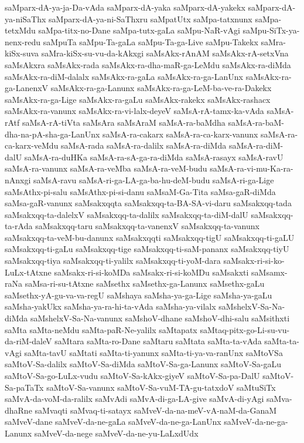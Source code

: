 {saMparx-dA-ya-ja-Da-vAda
saMparx-dA-yaka
saMparx-dA-yakekx
saMparx-dA-ya-niSaThx
saMparx-dA-ya-ni-SaThxru
saMpatUtx
saMpa-tatxnunx
saMpa-tetxMdu
saMpa-titx-no-Dane
saMpa-tutx-gaLa
saMpu-NaR-vAgi
saMpu-SiTx-ya-nenx-redu
saMpuTa
saMpu-Ta-gaLa
saMpu-Ta-ga-Live
saMpu-Takekx
saMra-kiSx-suva
saMra-kiSx-su-vu-da-kAkxgi
saMsAkx-rAnAM
saMsAkx-rA-setxVna
saMsAkxra
saMsAkx-rada
saMsAkx-ra-dha-maR-ga-LeMdu
saMsAkx-ra-diMda
saMsAkx-ra-diM-dalalx
saMsAkx-ra-gaLa
saMsAkx-ra-ga-LanUnx
saMsAkx-ra-ga-LanenxV
saMsAkx-ra-ga-Lanunx
saMsAkx-ra-ga-LeM-ba-ve-ra-Dakekx
saMsAkx-ra-ga-Lige
saMsAkx-ra-gaLu
saMsAkx-rakekx
saMsAkx-rashacx
saMsAkx-ra-vanunx
saMsAkx-ra-vi-lalx-deyeV
saMsA-rA-tamx-ka-vAda
saMsA-rAtf
saMsA-rA-tiVta
saMsAra
saMsAraM
saMsA-ra-baMdha
saMsA-ra-baM-dha-na-pA-sha-ga-LanUnx
saMsA-ra-cakarx
saMsA-ra-ca-karx-vanunx
saMsA-ra-ca-karx-veMdu
saMsA-rada
saMsA-ra-dalilx
saMsA-ra-diMda
saMsA-ra-diM-dalU
saMsA-ra-duHKa
saMsA-ra-sA-ga-ra-diMda
saMsA-rasayx
saMsA-ravU
saMsA-ra-vanunx
saMsA-ra-veMba
saMsA-ra-veM-budu
saMsA-ra-vi-mu-Ka-ra-nAnxgi
saMsA-ravu
saMsA-ri-ga-LA-ga-ba-hu-deM-budu
saMsA-ri-ga-Lige
saMsAthx-pi-salu
saMsAthx-pi-si-danu
saMsaM-Ga-Tita
saMsa-gaR-diMda
saMsa-gaR-vanunx
saMsakxqqta
saMsakxqq-ta-BA-SA-vi-daru
saMsakxqq-tada
saMsakxqq-ta-dalelxV
saMsakxqq-ta-dalilx
saMsakxqq-ta-diM-dalU
saMsakxqq-ta-rAda
saMsakxqq-taru
saMsakxqq-ta-vanenxV
saMsakxqq-ta-vanunx
saMsakxqq-ta-veM-bu-danunx
saMsakxqqti
saMsakxqq-tigU
saMsakxqq-ti-gaLU
saMsakxqq-ti-gaLu
saMsakxqq-tige
saMsakxqq-ti-saM-pananx
saMsakxqq-tiyU
saMsakxqq-tiya
saMsakxqq-ti-yalilx
saMsakxqq-ti-yoM-dara
saMsakx-ri-si-ko-LuLx-tAtxne
saMsakx-ri-si-koMDa
saMsakx-ri-si-koMDu
saMsakxti
saMsamx-raNa
saMsa-ri-su-tAtxne
saMsethx
saMsethx-ga-Lanunx
saMsethx-gaLu
saMsethx-yA-gu-va-va-regU
saMshaya
saMsha-ya-ga-Lige
saMsha-ya-gaLu
saMsha-yakUkx
saMsha-ya-ra-hi-ta-vAda
saMsha-ya-vilalx
saMshelxV-Sa-Na-diMda
saMshelxV-Sa-Na-vanunx
saMshoV-dhane
saMshoV-dhi-salu
saMsithxti
saMta
saMta-neMdu
saMta-paR-Ne-yalilx
saMtapatx
saMtaq-pitx-go-Li-su-vu-da-riM-daleV
saMtara
saMta-ro-Dane
saMtaru
saMtata
saMta-ta-vAda
saMta-ta-vAgi
saMta-tavU
saMtati
saMta-ti-yanunx
saMta-ti-ya-va-ranUnx
saMtoVSa
saMtoV-Sa-dalilx
saMtoV-Sa-diMda
saMtoV-Sa-ga-Lanunx
saMtoV-Sa-gaLu
saMtoV-Sa-go-LuLx-vudu
saMtoV-Sa-kAkx-giyeV
saMtoV-Sa-pa-DalU
saMtoV-Sa-paTaTx
saMtoV-Sa-vanunx
saMtoV-Sa-vuM-TA-gu-tatxdoV
saMtuSiTx
saMvA-da-voM-da-ralilx
saMvAdi
saMvA-di-ga-LA-give
saMvA-di-yAgi
saMva-dhaRne
saMvaqti
saMvaq-ti-satayx
saMveV-da-na-meV-vA-naM-da-GanaM
saMveV-dane
saMveV-da-ne-gaLa
saMveV-da-ne-ga-LanUnx
saMveV-da-ne-ga-Lanunx
saMveV-da-nege
saMveV-da-ne-yu-LaLxdUdx
}
